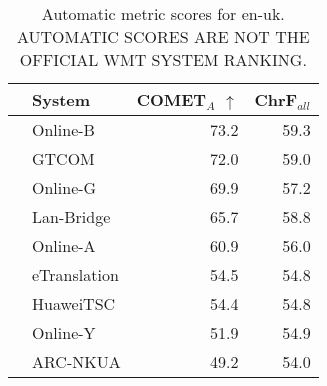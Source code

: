 \begin{table}
\centering
\caption{Automatic metric scores for en-uk. \\AUTOMATIC SCORES ARE NOT THE OFFICIAL WMT SYSTEM RANKING.}
\begin{tabular}{llrr}
\toprule
          &        System &  COMET$_{A}$ $\uparrow$ &  ChrF$_{all}$ \\
\midrule
 \Uncon{} &      Online-B &                    73.2 &          59.3 \\
 \Uncon{} &         GTCOM &                    72.0 &          59.0 \\
 \Uncon{} &      Online-G &                    69.9 &          57.2 \\
 \Uncon{} &    Lan-Bridge &                    65.7 &          58.8 \\
 \Uncon{} &      Online-A &                    60.9 &          56.0 \\
 \Const{} &  eTranslation &                    54.5 &          54.8 \\
 \Const{} &     HuaweiTSC &                    54.4 &          54.8 \\
 \Uncon{} &      Online-Y &                    51.9 &          54.9 \\
 \Uncon{} &      ARC-NKUA &                    49.2 &          54.0 \\
\bottomrule
\end{tabular}
\end{table}



